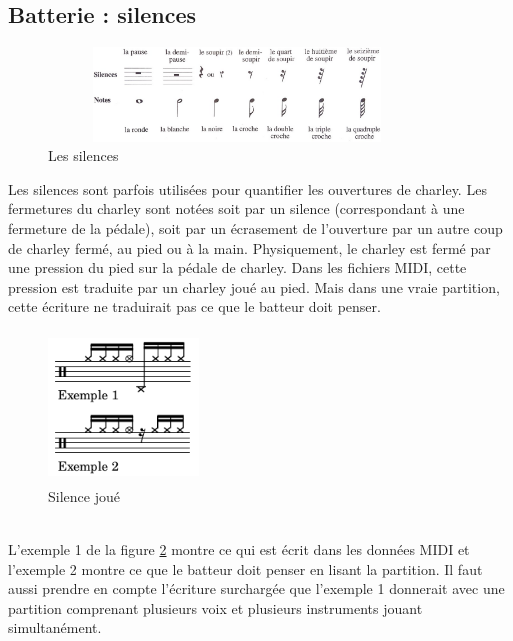 \subsection*{Batterie : silences}
\begin{figure}[h]
	\centering
	\includegraphics[height=25mm, width=100mm]{z_images/3_methodes/silences.png}
	\caption{Les silences}
	\label{silences}
\end{figure}
Les silences sont parfois utilisées pour quantifier les ouvertures de charley. Les fermetures du charley sont notées soit par un silence (correspondant à une fermeture de la pédale), soit par un écrasement de l’ouverture par un autre coup de charley fermé, au pied ou à la main.
Physiquement, le charley est fermé par une pression du pied sur la pédale de charley. Dans les fichiers MIDI, cette pression est traduite par un charley joué au pied. Mais dans une vraie partition, cette écriture ne traduirait pas ce que le batteur doit penser.
\begin{figure}[h]
	\centering
	\includegraphics[height=40mm, width=40mm]{z_images/3_methodes/silence_joue.png}
	\caption{Silence joué}
	\label{silence joue}
\end{figure}\\
L’exemple 1 de la figure \ref{silence joue} montre ce qui est écrit dans les données MIDI et l’exemple 2 montre ce que le batteur doit penser en lisant la partition. Il faut aussi prendre en compte l’écriture surchargée que l’exemple 1 donnerait avec une partition comprenant plusieurs voix et plusieurs instruments jouant simultanément.
